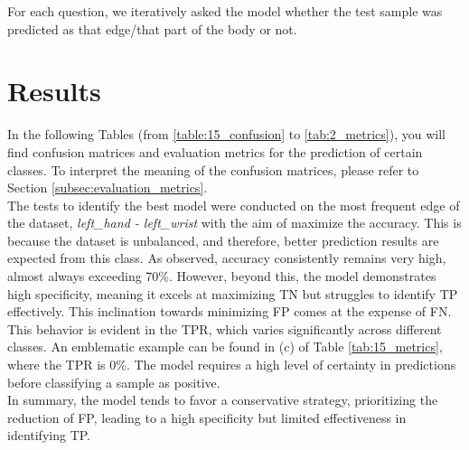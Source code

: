 For each question, we iteratively asked the model whether the test sample was predicted as that edge/that part of the body or not.

\section{Results}
In the following Tables (from \ref{table:15_confusion} to \ref{tab:2_metrics}), you will find confusion matrices and evaluation metrics for the prediction of certain classes.
To interpret the meaning of the confusion matrices, please refer to Section \ref{subsec:evaluation_metrics}.
\\

The tests to identify the best model were conducted on the most frequent edge of the dataset, \textit{left\_hand - left\_wrist} with the aim of maximize the accuracy.
This is because the dataset is unbalanced, and therefore, better prediction results are expected from this class.
As observed, accuracy consistently remains very high, almost always exceeding 70\%.
However, beyond this, the model demonstrates high specificity, meaning it excels at maximizing TN but struggles to identify TP effectively.
This inclination towards minimizing FP comes at the expense of FN.
This behavior is evident in the TPR, which varies significantly across different classes.
An emblematic example can be found in (c) of Table \ref{tab:15_metrics}, where the TPR is 0\%.
The model requires a high level of certainty in predictions before classifying a sample as positive. \\
In summary, the model tends to favor a conservative strategy, prioritizing the reduction of FP, leading to a high specificity but limited effectiveness in identifying TP.


